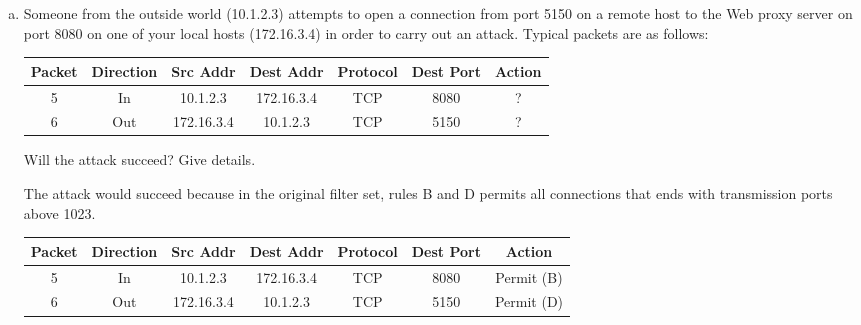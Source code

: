 \documentclass[12pt]{article}
\newcommand\tab[1][1cm]{\hspace*{#1}}
\begin{document}
\begin{description}
\begin{enumerate}[a.]
        \vspace{20pt} 
        
        \item {\color{grey} Someone from the outside world (10.1.2.3) attempts to open a connection from port 5150 on a remote host to the Web proxy server on port 8080 on one of your local hosts (172.16.3.4) in order to carry out an attack.  Typical packets are as follows:} \par
        \begin{center}
          \begin{tabular}{|c|c|c|c|c|c|c|}
            \hline
            \textbf{Packet} & \textbf{Direction} & \textbf{Src Addr} & \textbf{Dest Addr} & \textbf{Protocol} & \textbf{Dest Port} & \textbf{Action} \\
            \hline
            5 & In & 10.1.2.3 & 172.16.3.4 & TCP & 8080 & ? \\
            \hline
            6 & Out & 172.16.3.4 & 10.1.2.3 & TCP & 5150 & ? \\
            \hline
          \end{tabular}
        \end{center} \par
        
        {\color{grey}Will the attack succeed?  Give details.}\par
        \tab  The attack would succeed because in the original filter set, rules B and D permits all connections that ends with transmission ports above 1023.
        \begin{center}
          \begin{tabular}{|c|c|c|c|c|c|c|}
            \hline
            \textbf{Packet} & \textbf{Direction} & \textbf{Src Addr} & \textbf{Dest Addr} & \textbf{Protocol} & \textbf{Dest Port} & \textbf{Action} \\
            \hline
            5 & In & 10.1.2.3 & 172.16.3.4 & TCP & 8080 & Permit (B)\\
            \hline
            6 & Out & 172.16.3.4 & 10.1.2.3 & TCP & 5150 & Permit (D) \\
            \hline
          \end{tabular}
        \end{center} \par
        
        
    \end{enumerate}
    

\end{description}
\end{document}
